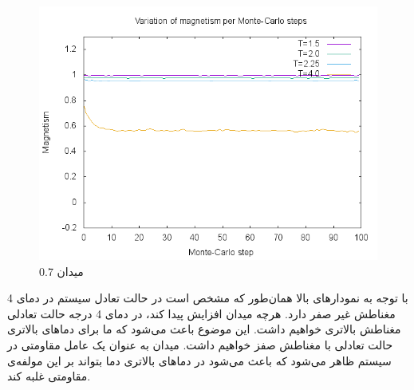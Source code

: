 \documentclass[a4paper,12pt]{article}
\begin{document}
\begin{figure}
\begin{center}
\includegraphics[scale=.8]{H-7.png}\caption{میدان 0.7}
\end{center}
\end{figure}


با توجه به نمودار‌های بالا همان‌طور که مشخص است در حالت تعادل سیستم در دمای 4
مغناطش غیر صفر دارد.
هرچه میدان افزایش پیدا کند، در دمای 4 درجه حالت تعادلی مغناطش بالاتری خواهیم داشت.
این موضوع باعث می‌شود که ما برای دماهای بالاتری حالت تعادلی با مغناطش صفز خواهیم داشت.
میدان به عنوان یک عامل مقاومتی در سیستم ظاهر می‌شود
که باعث می‌شود در دما‌های بالاتری دما بتواند بر این مولفه‌ی مقاومتی غلبه کند.
\end{document}
